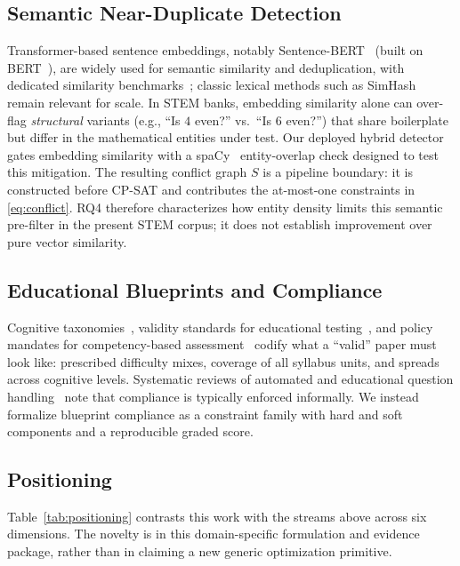 \documentclass[runningheads]{llncs}
\begin{document}
\subsection{Semantic Near-Duplicate Detection}
Transformer-based sentence embeddings, notably Sentence-BERT~\cite{reimers2019} (built on BERT~\cite{devlin2019}), are widely used for semantic similarity and deduplication, with dedicated similarity benchmarks~\cite{agirre2012};
classic lexical methods such as SimHash~\cite{charikar2002} remain relevant for scale.
In STEM banks, embedding similarity alone can over-flag \emph{structural} variants (e.g., ``Is $4$ even?'' vs.\ ``Is $6$ even?'') that share boilerplate but differ in the mathematical entities under test.
Our deployed hybrid detector gates embedding similarity with a spaCy~\cite{spacy2020} entity-overlap check designed to test this mitigation.
The resulting conflict graph $S$ is a pipeline boundary: it is constructed before CP-SAT and contributes the at-most-one constraints in \eqref{eq:conflict}.
RQ4 therefore characterizes how entity density limits this semantic pre-filter in the present STEM corpus;
it does not establish improvement over pure vector similarity.

\subsection{Educational Blueprints and Compliance}
Cognitive taxonomies~\cite{bloom1956,anderson2001}, validity standards for educational testing~\cite{standards2014}, and policy mandates for competency-based assessment~\cite{moenep2020} codify what a ``valid'' paper must look like: prescribed difficulty mixes, coverage of all syllabus units, and spreads across cognitive levels.
Systematic reviews of automated and educational question handling~\cite{kurdi2020} note that compliance is typically enforced informally.
We instead formalize blueprint compliance as a constraint family with hard and soft components and a reproducible graded score.

\subsection{Positioning}
Table~\ref{tab:positioning} contrasts this work with the streams above across six dimensions.
The novelty is in this domain-specific formulation and evidence package, rather than in claiming a new generic optimization primitive.
\end{document}
